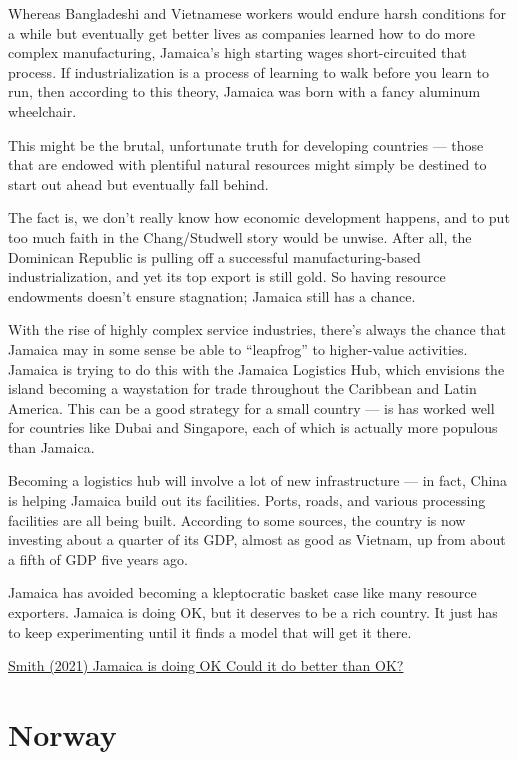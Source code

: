 \documentclass[
]{book}
\begin{document}
Whereas Bangladeshi and Vietnamese workers would endure harsh conditions for a while but eventually get better lives as companies learned how to do more complex manufacturing, Jamaica's high starting wages short-circuited that process. If industrialization is a process of learning to walk before you learn to run, then according to this theory, Jamaica was born with a fancy aluminum wheelchair.

This might be the brutal, unfortunate truth for developing countries --- those that are endowed with plentiful natural resources might simply be destined to start out ahead but eventually fall behind.

The fact is, we don't really know how economic development happens, and to put too much faith in the Chang/Studwell story would be unwise. After all, the Dominican Republic is pulling off a successful manufacturing-based industrialization, and yet its top export is still gold. So having resource endowments doesn't ensure stagnation; Jamaica still has a chance.

With the rise of highly complex service industries, there's always the chance that Jamaica may in some sense be able to ``leapfrog'' to higher-value activities. Jamaica is trying to do this with the Jamaica Logistics Hub, which envisions the island becoming a waystation for trade throughout the Caribbean and Latin America. This can be a good strategy for a small country --- is has worked well for countries like Dubai and Singapore, each of which is actually more populous than Jamaica.

Becoming a logistics hub will involve a lot of new infrastructure --- in fact, China is helping Jamaica build out its facilities. Ports, roads, and various processing facilities are all being built. According to some sources, the country is now investing about a quarter of its GDP, almost as good as Vietnam, up from about a fifth of GDP five years ago.

Jamaica has avoided becoming a kleptocratic basket case like many resource exporters.
Jamaica is doing OK, but it deserves to be a rich country. It just has to keep experimenting until it finds a model that will get it there.

\href{https://noahpinion.substack.com/p/jamaica-is-doing-ok}{Smith (2021) Jamaica is doing OK Could it do better than OK?}

\hypertarget{norway}{%
\section{Norway}\label{norway}}
\end{document}

